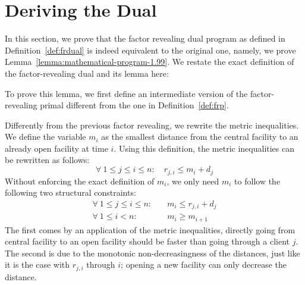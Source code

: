\section{Deriving the Dual}\label{sec:appendix-deriving-dual}

In this section, we prove that the factor revealing dual program as defined in Definition~\ref{def:frdual} is indeed equivalent to the original one, namely, we prove Lemma~\ref{lemma:mathematical-program-1.99}.
We restate the exact definition of the factor-revealing dual and its lemma here:


\lemmamathematicalprogram*

To prove this lemma, we first define an intermediate version of the factor-revealing primal different from the one in Definition~\ref{def:frp}.

Differently from the previous factor revealing, we rewrite the metric inequalities. We define the variable $m_i$ as the smallest distance from the central facility to an already open facility at time $i$. 
Using this definition, the metric inequalities can be rewritten as follows:
\begin{equation*}
    \forall \ 1 \le j \le i \le n: \quad r_{j,i} \le m_i + d_j
\end{equation*}
Without enforcing the exact definition of $m_i$, we only need $m_i$ to follow the following two structural constraints:
\begin{align*}
    \forall \ 1 \le j\le i \le n:& \quad m_i \le r_{j,i} + d_j \\
    \forall \ 1 \le i < n:& \quad m_i \ge m_{i+1}
\end{align*}
The first comes by an application of the metric inequalities, directly going from central facility to an open facility should be faster than going through a client $j$. The second is due to the monotonic non-decreasingness of the distances, just like it is the case with $r_{j,i}$ through $i$; opening a new facility can only decrease the distance.

